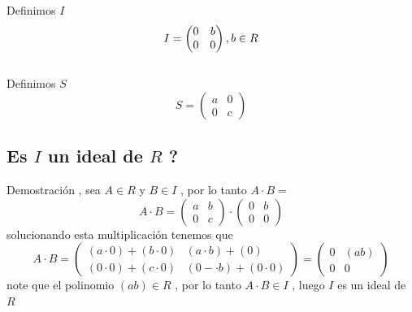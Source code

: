 \documentclass[10pt,a4paper]{article} %
\begin{document}
        Definimos $ I  $
        \begin{equation}
            I = \begin{pmatrix}
                0 & b
                \\
                0 & 0
            \end{pmatrix}
            \\
             , b \in R
        \end{equation}
        \\
        Definimos $ S  $
        \begin{equation}
            S = \begin{pmatrix}
                a & 0
                \\
                0 & c
            \end{pmatrix}
        \end{equation}

        \subsection{Es $ I  $ un ideal de $ R  $  ?}
            Demostración , sea $ A \in R  $  y $ B \in I  $  , por lo tanto $ A
            \cdot B  =  $
            \begin{equation}
                A \cdot  B = \begin{pmatrix}
                    a & b
                    \\
                    0 & c
                \end{pmatrix}
                \cdot
                \begin{pmatrix}
                    0 & b
                    \\
                    0 & 0
                \end{pmatrix}
            \end{equation}
            solucionando esta multiplicación tenemos que
            \begin{equation}
                A \cdot B = \begin{pmatrix}
                    (a \cdot 0) + (b \cdot 0) & (a \cdot b )+ (0 )
                    \\
                    (0 \cdot 0)+(c \cdot 0) & (0- \cdot b) + (0 \cdot 0)
                \end{pmatrix} =
                \begin{pmatrix}
                    0 & ( ab)
                    \\
                    0 & 0
                \end{pmatrix}
            \end{equation}
            note que el polinomio $ ( ab)  \in R $ , por lo tanto $ A \cdot B \in I
            $ , luego $ I  $ es un ideal de $ R  $
\end{document}
